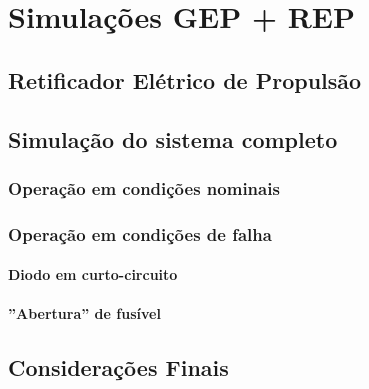 
\chapter[Simulações GEP + REP]{Simulações GEP + REP}

\section{Retificador Elétrico de Propulsão}

\section{Simulação do sistema completo}

\subsection{Operação em condições nominais}

\subsection{Operação em condições de falha}

\subsubsection{Diodo em curto-circuito}

\subsubsection{''Abertura'' de fusível}

\section{Considerações Finais}


